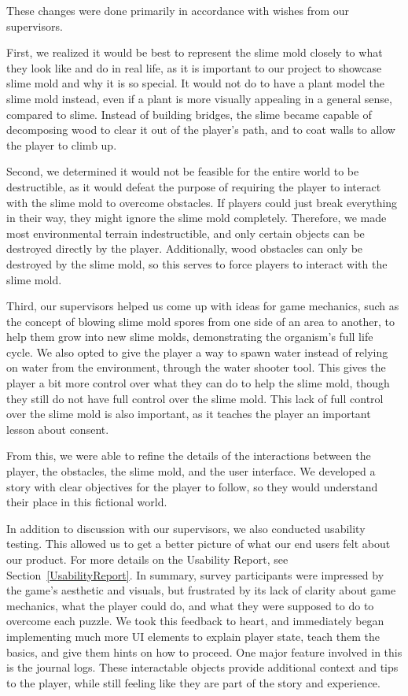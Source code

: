 \documentclass{article}
\begin{document}
These changes were done primarily in accordance with wishes from our supervisors.

First, we realized it would be best to represent the slime mold closely to what they look 
like and do in real life, as it is important to our project to showcase slime mold and why it 
is so special. It would not do to have a plant model the slime mold instead, even if a 
plant is more visually appealing in a general sense, compared to slime. Instead of building 
bridges, the slime became capable of decomposing wood to clear it out of the player's path, 
and to coat walls to allow the player to climb up.

Second, we determined it would not be feasible for the entire world to be destructible, as 
it would defeat the purpose of requiring the player to interact with the slime mold to 
overcome obstacles. If players could just break everything in their way, they might ignore 
the slime mold completely. Therefore, we made most environmental terrain indestructible,
and only certain objects can be destroyed directly by the player. Additionally, wood obstacles 
can only be destroyed by the slime mold, so this serves to force players to interact with 
the slime mold.

Third, our supervisors helped us come up with ideas for game mechanics, such as the concept 
of blowing slime mold spores from one side of an area to another, to help them grow into 
new slime molds, demonstrating the organism's full life cycle. We also opted to give the 
player a way to spawn water instead of relying on water from the environment, through the 
water shooter tool. This gives the player a bit more control over what they can do to help 
the slime mold, though they still do not have full control over the slime mold.
This lack of full control over the slime mold is also important, as it teaches the player 
an important lesson about consent. 

From this, we were able to refine the details of the interactions between the player, the 
obstacles, the slime mold, and the user interface. We developed a story with clear objectives
for the player to follow, so they would understand their place in this fictional world.

In addition to discussion with our supervisors, we also conducted usability testing.
This allowed us to get a better picture of what our end users felt about our product.
For more details on the Usability Report, see Section~\ref{UsabilityReport}.
In summary, survey participants were impressed by the game's aesthetic and visuals,
but frustrated by its lack of clarity about game mechanics, what the player could do,
and what they were supposed to do to overcome each puzzle. We took this feedback to 
heart, and immediately began implementing much more UI elements to explain player state, 
teach them the basics, and give them hints on how to proceed. One major feature involved 
in this is the journal logs. These interactable objects provide additional context and 
tips to the player, while still feeling like they are part of the story and experience.
\end{document}

